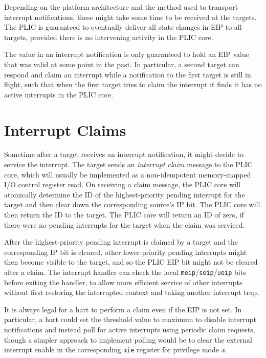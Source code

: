 Depending on the platform architecture and the method used to
transport interrupt notifications, these might take some time to be
received at the targets.  The PLIC is guaranteed to eventually deliver
all state changes in EIP to all targets, provided there is no
intervening activity in the PLIC core.

\begin{commentary}
The value in an interrupt notification is only guaranteed to hold an
EIP value that was valid at some point in the past.  In particular, a
second target can respond and claim an interrupt while a notification
to the first target is still in flight, such that when the first
target tries to claim the interrupt it finds it has no active
interrupts in the PLIC core.
\end{commentary}

\section{Interrupt Claims}

Sometime after a target receives an interrupt notification, it might
decide to service the interrupt.  The target sends an {\em interrupt
  claim} message to the PLIC core, which will usually be implemented
as a non-idempotent memory-mapped I/O control register read.  On
receiving a claim message, the PLIC core will atomically determine the
ID of the highest-priority pending interrupt for the target and then
clear down the corresponding source's IP bit.  The PLIC core will then
return the ID to the target.  The PLIC core will return an ID of zero,
if there were no pending interrupts for the target when the claim was
serviced.

After the highest-priority pending interrupt is claimed by a target
and the corresponding IP bit is cleared, other lower-priority pending
interrupts might then become visible to the target, and so the PLIC
EIP bit might not be cleared after a claim.  The interrupt handler
can check the local {\tt meip}/{\tt seip}/{\tt ueip} bits
before exiting the handler, to allow more efficient service of other
interrupts without first restoring the interrupted context and taking
another interrupt trap.

It is always legal for a hart to perform a claim even if the EIP is
not set.  In particular, a hart could set the threshold value to maximum
to disable interrupt notifications and instead poll for active
interrupts using periodic claim requests, though a simpler approach to
implement polling would be to clear the external interrupt enable in
the corresponding {\em x}{\tt ie} register for privilege mode {\em x}.

